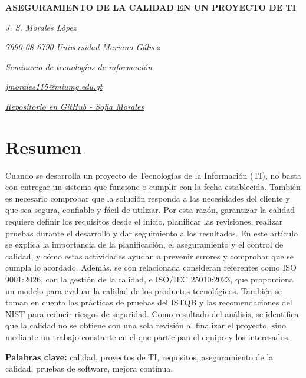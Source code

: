\documentclass[12pt]{article}
\author{Jenny Sofía Morales}
\begin{document}
\begin{center}
    {\bfseries\fontsize{12}{14}\selectfont
        ASEGURAMIENTO DE LA CALIDAD EN UN PROYECTO DE TI
    }

    \vspace{0.4cm}

    {\itshape J. S. Morales López}

    \vspace{0.2cm}

    {\itshape 7690-08-6790 Universidad Mariano Gálvez}

    {\itshape Seminario de tecnologías de información}

    {\itshape
        \href{mailto:jmorales115@miumg.edu.gt}
        {jmorales115@miumg.edu.gt}
    }

    {\itshape
        \href{https://github.com/sofiaMorales3805/ForoAcademico-Seminario}
        {Repositorio en GitHub - Sofia Morales}
    }
\end{center}

\vspace{0.5cm}
\section*{Resumen}

Cuando se desarrolla un proyecto de Tecnologías de la Información (TI), no
basta con entregar un sistema que funcione o cumplir con la fecha establecida.
También es necesario comprobar que la solución responda a las necesidades del
cliente y que sea segura, confiable y fácil de utilizar. Por esta razón,
garantizar la calidad requiere definir los requisitos desde el inicio,
planificar las revisiones, realizar pruebas durante el desarrollo y dar
seguimiento a los resultados. En este artículo se explica la importancia de la
planificación, el aseguramiento y el control de calidad, y cómo estas
actividades ayudan a prevenir errores y comprobar que se cumpla lo acordado.
Además, se con relacionada consideran referentes como ISO 9001:2026, con la
gestión de la calidad, e ISO/IEC 25010:2023, que proporciona un modelo para
evaluar la calidad de los productos tecnológicos. También se toman en cuenta
las prácticas de pruebas del ISTQB y las recomendaciones del NIST para reducir
riesgos de seguridad. Como resultado del análisis, se identifica que la
calidad no se obtiene con una sola revisión al finalizar el proyecto, sino
mediante un trabajo constante en el que participan el equipo y los interesados.

\noindent\textbf{Palabras clave:} calidad, proyectos de TI, requisitos,
aseguramiento de la calidad, pruebas de software, mejora continua.
\end{document}
